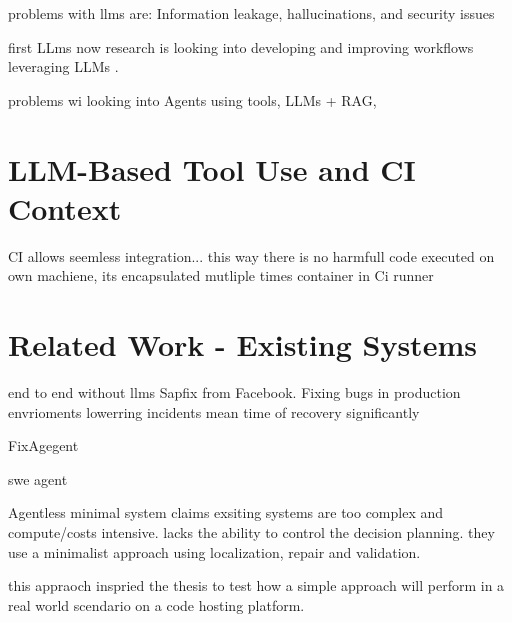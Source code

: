 problems with llms are: Information leakage, hallucinations, and security issues

first LLms now research is looking into developing and improving workflows leveraging LLMs \cite{puvvadiCodingAgentsComprehensive2025}.

problems wi
looking into Agents using tools, LLMs + RAG,

\section{LLM-Based Tool Use and CI Context}

CI allows seemless integration...
this way there is no harmfull code executed on own machiene, its encapsulated mutliple times container in Ci runner


\section{Related Work - Existing Systems}


end to end without llms Sapfix from Facebook. Fixing bugs in production envrioments lowerring incidents mean time of recovery significantly \cite{margineanSapFixAutomatedEndtoEnd2019}

FixAgegent \cite{leeUnifiedDebuggingApproach2024}

swe agent \cite{yangSWEagentAgentComputerInterfaces2024}

Agentless minimal system \cite{xiaAgentlessDemystifyingLLMbased2024}
claims exsiting systems are too complex and compute/costs intensive.
lacks the ability to control the decision planning.
they use a minimalist approach using localization, repair and validation.


this appraoch inspried the thesis to test how a simple approach will perform in a real world scendario on a code hosting platform.